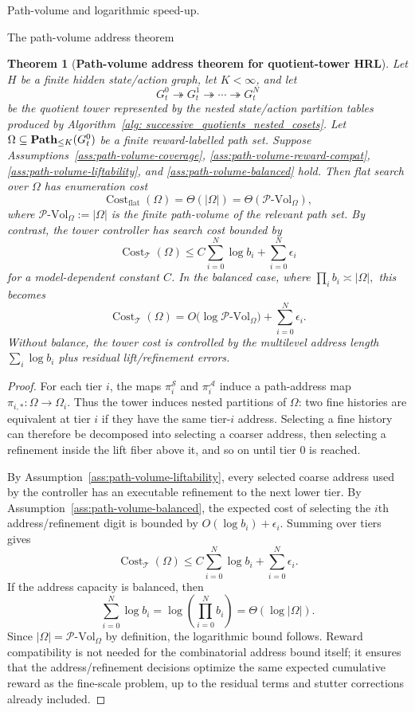 \documentclass[11pt]{article}
\newtheorem{theorem}[subsubsection]{Theorem}
\newcommand{\PVol}{\mathcal{P}\text{-}\mathrm{Vol}}
\newcommand{\cost}{\operatorname{Cost}}
\begin{document}
\begin{section}{Path-volume and logarithmic speed-up.}
\begin{subsection}{The path-volume address theorem}
\begin{theorem}[{\bf Path-volume address theorem for quotient-tower HRL}]\label{thm:path-volume-address}
Let $H$ be a finite hidden state/action graph, let $K<\infty$, and let
$$
G_t^0 \twoheadrightarrow G_t^1 \twoheadrightarrow \cdots \twoheadrightarrow G_t^N
$$
be the quotient tower represented by the nested state/action partition tables produced by Algorithm~\ref{alg: successive_quotients_nested_cosets}. Let
$
\Omega\subseteq\bold{Path}_{\le K}(G_t^0)
$
be a finite reward-labelled path set. Suppose Assumptions~\ref{ass:path-volume-coverage}, \ref{ass:path-volume-reward-compat}, \ref{ass:path-volume-liftability}, and \ref{ass:path-volume-balanced} hold. Then flat search over $\Omega$ has enumeration cost
$$
\cost_{\mathrm{flat}}(\Omega)
=
\Theta(|\Omega|)
=
\Theta(\PVol_{\Omega}),
$$
where $\PVol_{\Omega}:=|\Omega|$ is the finite path-volume of the relevant path set. By contrast, the tower controller has search cost bounded by
$$
\cost_{\mathcal{T}}(\Omega)
\le
C\sum_{i=0}^{N}\log b_i+\sum_{i=0}^{N}\epsilon_i
$$
for a model-dependent constant $C$. In the balanced case, where
$
\prod_i b_i\asymp |\Omega|,
$
this becomes
$$
\cost_{\mathcal{T}}(\Omega)
=
O\bigl(\log \PVol_{\Omega}\bigr)
+
\sum_{i=0}^{N}\epsilon_i.
$$
Without balance, the tower cost is controlled by the multilevel address length $\sum_i\log b_i$ plus residual lift/refinement errors.
\end{theorem}

\begin{proof}
For each tier $i$, the maps
$
\pi_i^{\mathcal S}
$
and
$
\pi_i^{\mathcal A}
$
induce a path-address map
$
\pi_{i,*}:\Omega\to\Omega_i.
$
Thus the tower induces nested partitions of $\Omega$: two fine histories are equivalent at tier $i$ if they have the same tier-$i$ address. Selecting a fine history can therefore be decomposed into selecting a coarser address, then selecting a refinement inside the lift fiber above it, and so on until tier $0$ is reached.

By Assumption~\ref{ass:path-volume-liftability}, every selected coarse address used by the controller has an executable refinement to the next lower tier. By Assumption~\ref{ass:path-volume-balanced}, the expected cost of selecting the $i$th address/refinement digit is bounded by
$
O(\log b_i)+\epsilon_i.
$
Summing over tiers gives
$$
\cost_{\mathcal{T}}(\Omega)
\le
C\sum_{i=0}^{N}\log b_i
+
\sum_{i=0}^{N}\epsilon_i.
$$
If the address capacity is balanced, then
$$
\sum_{i=0}^{N}\log b_i
=
\log\left(\prod_{i=0}^{N}b_i\right)
=
\Theta(\log|\Omega|).
$$
Since $|\Omega|=\PVol_{\Omega}$ by definition, the logarithmic bound follows. Reward compatibility is not needed for the combinatorial address bound itself; it ensures that the address/refinement decisions optimize the same expected cumulative reward as the fine-scale problem, up to the residual terms and stutter corrections already included.
\end{proof}


\end{subsection}
\end{section}
\end{document}
